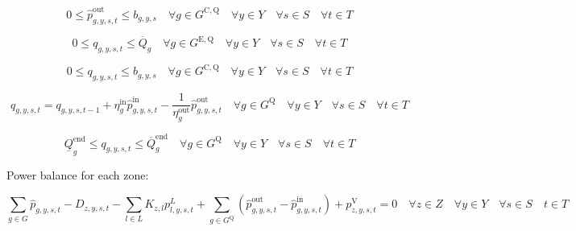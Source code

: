 \documentclass{article}
\newcommand{\sGenerators}{G}
\newcommand{\sStorage}{G^{\mathrm{Q}}}
\newcommand{\sStorageExisting}{G^{\mathrm{E,Q}}}
\newcommand{\sStorageCandidate}{G^{\mathrm{C,Q}}}
\newcommand{\sYears}{Y}
\newcommand{\sScenarios}{S}
\newcommand{\sIntervals}{T}
\newcommand{\sZones}{Z}
\newcommand{\sLinks}{L}
\newcommand{\iGenerator}{g}
\newcommand{\iYear}{y}
\newcommand{\iScenario}{s}
\newcommand{\iInterval}{t}
\newcommand{\iZone}{z}
\newcommand{\iLink}{l}
\newcommand{\cStorageUnitEnergyMax}[1][\iGenerator]{\overline{Q}_{#1}}
\newcommand{\cStorageUnitEnergyIntervalEndMax}[1][\iGenerator]{\overline{Q}^{\mathrm{end}}_{#1}}
\newcommand{\cStorageUnitEnergyIntervalEndMin}[1][\iGenerator]{\underline{Q}^{\mathrm{end}}_{#1}}
\newcommand{\cStorageUnitEfficiencyCharging}{\eta_{\iGenerator}^{\mathrm{in}}}
\newcommand{\cStorageUnitEfficiencyDischarging}{\eta_{\iGenerator}^{\mathrm{out}}}
\newcommand{\cDemand}[1][\iZone,\iYear,\iScenario,\iInterval]{D_{#1}}
\newcommand{\cIncidenceMatrix}[1][\iZone,\iLink]{K_{#1}}
\newcommand{\vPowerTotal}[1][\iGenerator,\iYear,\iScenario,\iInterval]{\hat{p}_{#1}}
\newcommand{\vPowerTotalIn}[1][\iGenerator,\iYear,\iScenario,\iInterval]{\hat{p}^{\mathrm{in}}_{#1}}
\newcommand{\vPowerTotalOut}[1][\iGenerator,\iYear,\iScenario,\iInterval]{\hat{p}^{\mathrm{out}}_{#1}}
\newcommand{\vStorageUnitEnergy}[1][\iGenerator,\iYear,\iScenario,\iInterval]{q_{#1}}
\newcommand{\vPowerFlow}[1][\iLink,\iYear,\iScenario,\iInterval]{p^{\sLinks}_{#1}}
\newcommand{\vLostLoadPower}[1][\iZone,\iYear,\iScenario,\iInterval]{p^{\mathrm{V}}_{#1}}
\newcommand{\vInstalledCapacityTotalScenario}[1][\iGenerator,\iYear,\iScenario]{b_{#1}}
\begin{document}
\begin{equation}
0 \leq \vPowerTotalOut \leq \vInstalledCapacityTotalScenario \quad \forall \iGenerator \in \sStorageCandidate \quad \forall \iYear \in \sYears \quad \forall \iScenario \in \sScenarios \quad \forall \iInterval \in \sIntervals
\end{equation}

\begin{equation}
0 \leq \vStorageUnitEnergy \leq \cStorageUnitEnergyMax \quad \forall \iGenerator \in \sStorageExisting \quad \forall \iYear \in \sYears \quad \forall \iScenario \in \sScenarios \quad \forall \iInterval \in \sIntervals
\end{equation}

\begin{equation}
0 \leq \vStorageUnitEnergy \leq \vInstalledCapacityTotalScenario \quad \forall \iGenerator \in \sStorageCandidate \quad \forall \iYear \in \sYears \quad \forall \iScenario \in \sScenarios \quad \forall \iInterval \in \sIntervals
\end{equation}

\begin{equation}
\vStorageUnitEnergy = \vStorageUnitEnergy[\iGenerator,\iYear,\iScenario,\iInterval-1] + \cStorageUnitEfficiencyCharging \vPowerTotalIn - \frac{1}{\cStorageUnitEfficiencyDischarging} \vPowerTotalOut \quad \forall \iGenerator \in \sStorage \quad \forall \iYear \in \sYears \quad \forall \iScenario \in \sScenarios \quad \forall \iInterval \in \sIntervals
\end{equation}


\begin{equation}
\cStorageUnitEnergyIntervalEndMin \leq \vStorageUnitEnergy \leq \cStorageUnitEnergyIntervalEndMax \quad \forall \iGenerator \in \sStorage \quad \forall \iYear \in \sYears \quad \forall \iScenario \in \sScenarios \quad \forall \iInterval \in \sIntervals
\end{equation}

Power balance for each zone:

\begin{equation}
\sum\limits_{\iGenerator \in \sGenerators} \vPowerTotal - \cDemand - \sum\limits_{\iLink \in \sLinks} \cIncidenceMatrix \vPowerFlow + \sum\limits_{\iGenerator \in \sStorage} \left(\vPowerTotalOut - \vPowerTotalIn\right) + \vLostLoadPower = 0 \quad \forall \iZone \in \sZones \quad \forall \iYear \in \sYears \quad \forall \iScenario \in \sScenarios \quad \iInterval \in \sIntervals
\end{equation}
\end{document}
